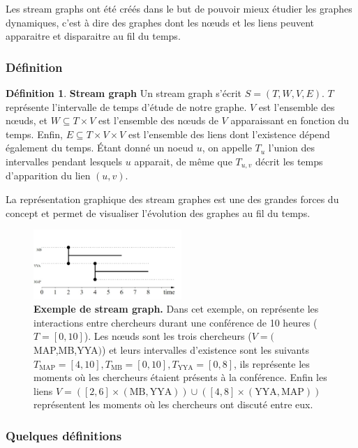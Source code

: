 \documentclass[11pt,a4paper]{article}
\theoremstyle{definition}
\newtheorem{defn}{Définition}
\theoremstyle{remark}
\theoremstyle{remark}
\begin{document}
Les stream graphs ont été créés dans le but de pouvoir mieux étudier les graphes dynamiques, c'est à dire des graphes dont les nœuds et les liens peuvent apparaitre et disparaitre au fil du temps.

\subsubsection{Définition}

\begin{defn}{\textbf{Stream graph}}
Un stream graph s'écrit $S=(T,W,V,E)$. $T$ représente l'intervalle de temps d'étude de notre graphe. $V$ est l'ensemble des nœuds, et $W \subseteq T \times V$ est l'ensemble des nœuds de $V$ apparaissant en fonction du temps. Enfin, $E \subseteq T \times V \times V$ est l'ensemble des liens dont l'existence dépend également du temps. Étant donné un noeud $u$, on appelle $T_u$ l'union des intervalles pendant lesquels $u$ apparait, de même que $T_{u,v}$ décrit les temps d'apparition du lien $(u,v)$.
\end{defn}

La représentation graphique des stream graphes est une des grandes forces du concept et permet de visualiser l'évolution des graphes au fil du temps.

\begin{figure}[H]
\centering
\includegraphics[width=0.5\textwidth]{exStreamGraph.JPG}
\caption{\textbf{Exemple de stream graph.} Dans cet exemple, on représente les interactions entre chercheurs durant une conférence de 10 heures ($T=[0,10]$). Les nœuds sont les trois chercheurs ($V=($MAP,MB,YYA$)$) et leurs intervalles d'existence sont les suivants $T_{\text{MAP}}=[4,10], T_{\text{MB}}=[0,10], T_{\text{YYA}}=[0,8]$, ils représente les moments où les chercheurs étaient présents à la conférence. Enfin les liens $V=([2,6]\times (\text{MB},\text{YYA})) \cup ([4,8]\times(\text{YYA},\text{MAP}))$ représentent les moments où les chercheurs ont discuté entre eux.}
\end{figure}




\subsubsection{Quelques définitions}
\end{document}
